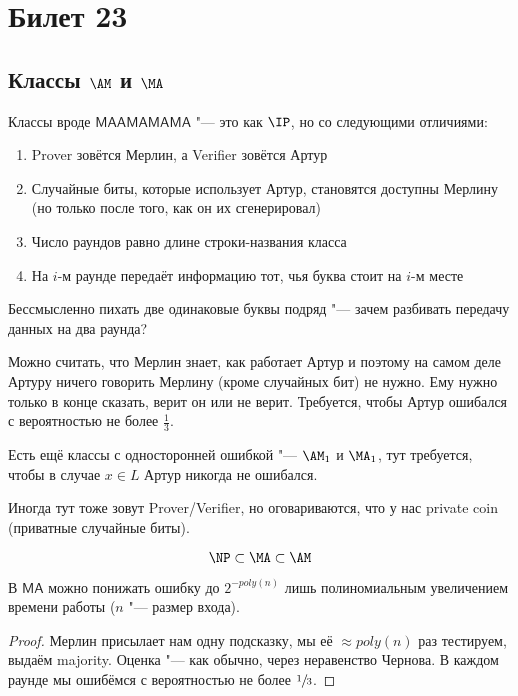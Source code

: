 \setcounter{section}{22}
\section{Билет 23}
\subsection[Классы AM и MA]{Классы $\AM$ и $\MA$}
	\begin{Def}
		Классы вроде $\mathsf{MAAMAMAMA}$ "--- это как $\IP$, но со следующими отличиями:
		\begin{enumerate}
			\item Prover зовётся Мерлин, а Verifier зовётся Артур
			\item Случайные биты, которые использует Артур, становятся доступны Мерлину (но только после того, как он их сгенерировал)
			\item Число раундов равно длине строки-названия класса
			\item На $i$-м раунде передаёт информацию тот, чья буква стоит на $i$-м месте
		\end{enumerate}
	\end{Def}
	\begin{Rem}
		Бессмысленно пихать две одинаковые буквы подряд "--- зачем разбивать передачу данных на два раунда?
	\end{Rem}
	\begin{Rem}
		Можно считать, что Мерлин знает, как работает Артур и поэтому на самом деле Артуру ничего говорить Мерлину (кроме случайных бит) не нужно.
		Ему нужно только в конце сказать, верит он или не верит.
		Требуется, чтобы Артур ошибался с вероятностью не более $\frac 13$.
	\end{Rem}
	\begin{Rem}
		Есть ещё классы с односторонней ошибкой "--- $\AM_1$ и $\MA_1$, тут требуется, чтобы в случае $x \in L$ Артур никогда не ошибался.
	\end{Rem}
	\begin{Rem}
		Иногда тут тоже зовут Prover/Verifier, но оговариваются, что у нас private coin (приватные случайные биты).
	\end{Rem}
	\begin{Rem}
		\[ \NP \subset \MA \subset \AM \]
	\end{Rem}

	\begin{assertion}
		В $\mathsf{MA}$ можно понижать ошибку до $2^{-poly(n)}$ лишь полиномиальным увеличением времени работы ($n$ "--- размер входа).
	\end{assertion}
	\begin{proof}
		Мерлин присылает нам одну подсказку, мы её $\approx poly(n)$ раз тестируем, выдаём majority.
		Оценка "--- как обычно, через неравенство Чернова.
		В каждом раунде мы ошибёмся с вероятностью не более $\sfrac 13$.
	\end{proof}

